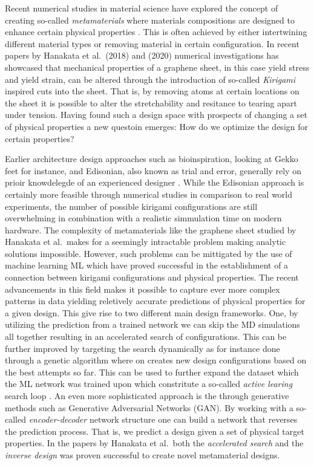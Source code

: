 Recent numerical studies in material science have explored the concept of
creating so-called \textit{metamaterials} where materials compositions are
designed to enhance certain physical properties
\cite{PhysRevLett.121.255304}\cite{PhysRevResearch.2.042006}\cite{graphene/hBN}\cite{Mao}\cite{Yang}\cite{Forte}.
This is often achieved by either intertwining different material types or
removing material in certain configuration. In recent papers by Hanakata et al.\
\cite{PhysRevLett.121.255304}(2018) and \cite{PhysRevResearch.2.042006}(2020)
numerical investigations has showcased that mechanical properties of a graphene
sheet, in this case yield stress and yield strain, can be altered through the
introduction of so-called \textit{Kirigami} inspired cuts into the sheet. That
is, by removing atoms at certain locations on the sheet it is possible to alter the stretchability and resitance to tearing apart under tension. Having found such a design space with prospects of changing a set of physical properties a new questoin emerges: How do we optimize the design for certain properties? 

Earlier architecture design approaches such as
bioinspiration, looking at Gekko feet for instance, and Edisonian, also known as trial and error, generally rely on prioir
knowdelegde of an experienced designer \cite{Mao}. While the Edisonian approach
is certainly more feasible through  numerical studies in comparison to real world
experiments, the number of possible kirigami configurations are still overwhelming in combination with a realistic simmulation time on modern hardware. The complexity of metamaterials like the graphene sheet studied by Hanakata et al.\ makes for a seemingly intractable problem making analytic solutions impossible. However, such problems can be mittigated by the use of machine learning \acrshort{ML} which have proved successful in the establishment of a connection between kirigami configurations and physical
properties. The recent advancements in this field makes it possible to capture
ever more complex patterns in data yielding reletively accurate predictions of
physical properties for a given design. This give rise to two different main design frameworks. One, by utilizing the prediction from a trained network we can skip the \acrshort{MD} simulations all together resulting in an accelerated search of configurations. This can be further improved by targeting the search dynamically as for instance done through a genetic algorithm where on creates new design configurations based on the best attempts so far. This can be used to further expand the dataset which the \acrshort{ML} network was trained upon which constritute a so-called \textit{active learing} search loop \cite{PhysRevLett.121.255304}. An even more sophisticated approach is the through generative methods such
as Generative Adversarial Networks (GAN). By working with a so-called \textit{encoder-decoder} network structure one can build a network that reverses the prediction process. That is, we predict a design given a set of physical target properties. In the papers by Hanakata et al.\ both the
\textit{accelerated search} and the \textit{inverse design} was proven
successful to create novel metamaterial designs. 


